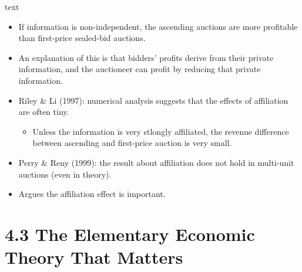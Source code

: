 \documentclass[uplatex,14pt,dvipdfmx,xcolor=svgnames]{beamer}
\begin{document}
\begin{frame}[t]{\ssecIIa\textcolor[rgb]{0.2,0.2,0.7}{text}}
	
\begin{itemize}
	\item If information is non-independent, the ascending auctions are more profitable than first-price sealed-bid auctions.
	\item An explanation of this is that bidders' profits derive from their private information, and the auctioneer can profit by reducing that private information.
\end{itemize}
	
\end{frame}

\begin{frame}[t]{\ssecIIa}
	
\begin{itemize}
	\item Riley \& Li (1997): numerical analysis suggests that the effects of affiliation are often tiny.
	\begin{itemize}
		\item Unless the information is very stlongly affiliated, the revenue difference between ascending and first-price auction is very small.
	\end{itemize}
	\item Perry \& Reny (1999): the result about affiliation does not hold in multi-unit auctions {\small (even in theory)}.
	\item Argues the affiliation effect is important.
\end{itemize}
	
\end{frame}

\newcommand{\secIII}{4.3 The Elementary Economic Theory That Matters}
\section{\secIII}
\newcommand{\ssecIIIa}{4.3.1 Entry}
\end{document}
